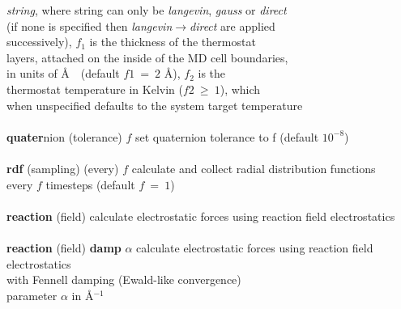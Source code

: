 \begin{tabbing}
\>                                              \> {\em string}, where string can only be {\em langevin}, {\em gauss} or {\em direct} \\
\>                                              \> (if none is specified then {\em langevin$\rightarrow$direct} are applied \\
\>                                              \> successively), $f_{1}$ is the thickness of the thermostat \\
\>                                              \> layers, attached on the inside of the MD cell boundaries, \\
\>                                              \> in units of \AA~~(default $f{1}~=~2$ \AA), $f_{2}$ is the \\
\>                                              \> thermostat temperature in Kelvin ($f{2}~\ge~1$), which \\
\>                                              \> when unspecified defaults to the system target temperature \\
\>                                              \> \\
\> {\bf quater}nion (tolerance) $f$             \> set quaternion tolerance to f (default $10^{-8}$) \\
\>                                              \> \\
\> {\bf rdf} (sampling) (every) $f$             \> calculate and collect radial distribution functions \\
\>                                              \> every $f$ timesteps (default $f~=~1$) \\
\>                                              \> \\
\> {\bf reaction} (field)                       \> calculate electrostatic forces using reaction field electrostatics \\
\>                                              \> \\
\> {\bf reaction} (field) {\bf damp} $\alpha$   \> calculate electrostatic forces using reaction field electrostatics \\
\>                                              \> with Fennell \cite{fennell-06a} damping (Ewald-like convergence) \\
\>                                              \> parameter $\alpha$ in \AA$^{-1}$ \\

\end{tabbing}
